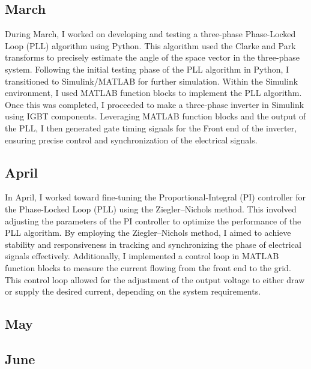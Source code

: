 \subsection{March}

During March, I worked on developing and testing a three-phase Phase-Locked
Loop (PLL) algorithm using Python. This algorithm used the Clarke and Park
transforms to precisely estimate the angle of the space vector in the
three-phase system. Following the initial testing phase of the PLL algorithm in
Python, I transitioned to Simulink/MATLAB for further simulation. Within the
Simulink environment, I used MATLAB function blocks to implement the PLL
algorithm. Once this was completed, I proceeded to make a three-phase inverter
in Simulink using IGBT components. Leveraging MATLAB function blocks and the
output of the PLL, I then generated gate timing signals for the Front end of
the inverter, ensuring precise control and synchronization of the electrical
signals.

\subsection{April}

In April, I worked toward fine-tuning the Proportional-Integral (PI) controller
for the Phase-Locked Loop (PLL) using the Ziegler–Nichols method. This involved
adjusting the parameters of the PI controller to optimize the performance of
the PLL algorithm. By employing the Ziegler–Nichols method, I aimed to achieve
stability and responsiveness in tracking and synchronizing the phase of
electrical signals effectively. Additionally, I implemented a control loop in
MATLAB function blocks to measure the current flowing from the front end to the
grid. This control loop allowed for the adjustment of the output voltage to
either draw or supply the desired current, depending on the system
requirements.

\subsection{May}
\blindtext

\subsection{June}
\blindtext
